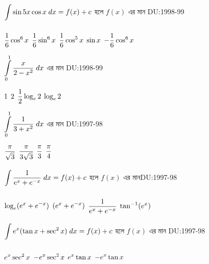 \documentclass[addpoints]{exam}
\begin{document}
\begin{questions}
\question  $\mathlarger{\int\limits_{}^{} \sin 5x \cos x  \;dx = f(x)+c}$ হলে $f(x)$ এর মান
\hfill \textsc{DU:1998-99}

\begin{oneparchoices}

\choice $\mathlarger{\frac{1}{6} \cos ^6 x}$
\choice $\mathlarger{\frac{1}{6} \sin ^6 x}$
\choice $\mathlarger{\frac{1}{6} \cos ^5 x\;\sin x}$
\choice $\mathlarger{-\frac{1}{6} \cos ^6 x}$

\end{oneparchoices}

\question  $\mathlarger{\int\limits_{0}^{1} \frac{x}{2-x^2}\;dx}$  এর মান
\hfill \textsc{DU:1998-99}

\begin{oneparchoices}

\choice $\mathlarger{1}$
\choice $\mathlarger{2}$
\choice $\mathlarger{\frac{1}{2}\log_e 2}$
\choice $\mathlarger{\log_e 2}$
\end{oneparchoices}

\question  $\mathlarger{\int\limits_{0}^{1} \frac{1}{3+x^2}\;dx}$ এর মান
\hfill \textsc{DU:1997-98}

\begin{oneparchoices}

\choice $\mathlarger{\frac{\pi}{\sqrt{3}}}$
\choice $\mathlarger{\frac{\pi}{3\sqrt{3}}}$
\choice $\mathlarger{\frac{\pi}{3}}$
\choice $\mathlarger{\frac{\pi}{4}}$
\end{oneparchoices}

\question  $\mathlarger{\int\limits_{}^{} \frac{1}{e^{x}+e^{-x}}\;dx = f(x)+c}$  হলে $f(x)$ এর মান\hfill \textsc{DU:1997-98}

\begin{oneparchoices}

\choice $\mathlarger{\log_e (e^{x}+e^{-x})}$
\choice $\mathlarger{ (e^{x}+e^{-x})}$
\choice $\mathlarger{\frac{1}{e^{x}+e^{-x}}}$
\choice $\mathlarger{\tan ^{-1}(e^{x})}$

\end{oneparchoices}

\question  $\mathlarger{\int\limits_{}^{} e^{x}(\tan x + \sec^{2} x)\;dx = f(x)+c}$  হলে $f(x)$ এর মান 
\hfill \textsc{DU:1997-98}

\begin{oneparchoices}

\choice $\mathlarger{e^{x}\sec ^{2}x}$
\choice $\mathlarger{-e^{x}\sec ^{2}x}$
\choice $\mathlarger{e^{x}\tan x}$
\choice  $\mathlarger{-e^{x}\tan x}$


\end{oneparchoices}
\end{questions}
\end{document}

